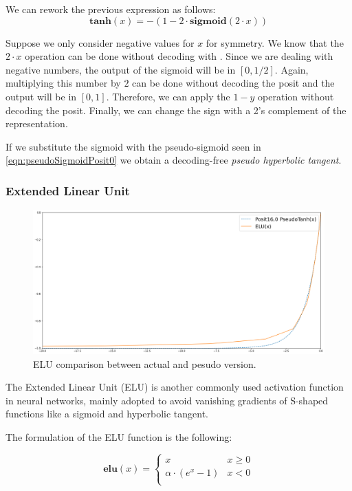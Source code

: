 We can rework the previous expression as follows:
\begin{equation}
    \mathbf{tanh}(x) = - ( 1 - 2\cdot \mathbf{sigmoid}(2\cdot x))
\end{equation}

Suppose we only consider negative values for $x$ for symmetry. We know that the $2\cdot x$ operation can be done without decoding with . Since we are dealing with negative numbers, the output of the sigmoid will be in $[0,1/2]$. Again, multiplying this number by $2$ can be done without decoding the posit and the output will be in $[0,1]$. Therefore, we can apply the $1-y$ operation without decoding the posit. Finally, we can change the sign with a 2's complement of the representation.

If we substitute the sigmoid with the pseudo-sigmoid seen in \eqref{eqn:pseudoSigmoidPosit0} we obtain a decoding-free \textit{pseudo hyperbolic tangent}.

\subsubsection{Extended Linear Unit}

\begin{figure}
    \centering
    \includegraphics[width=\linewidth]{img/eluPosit160.png}
    \caption{ELU comparison between actual and pesudo version.}
    \label{fig:pseudoEluPosit0}
\end{figure}


The Extended Linear Unit (ELU) is another commonly used activation function in neural networks, mainly adopted to avoid vanishing gradients of S-shaped functions like a sigmoid and hyperbolic tangent.

The formulation of the ELU function is the following:

\begin{equation}
\mathbf{elu}(x)=\left\{\begin{matrix}
x & x \geq 0 \\
\alpha \cdot (e^x - 1) & x < 0  \\
\end{matrix}\right.
\end{equation}

